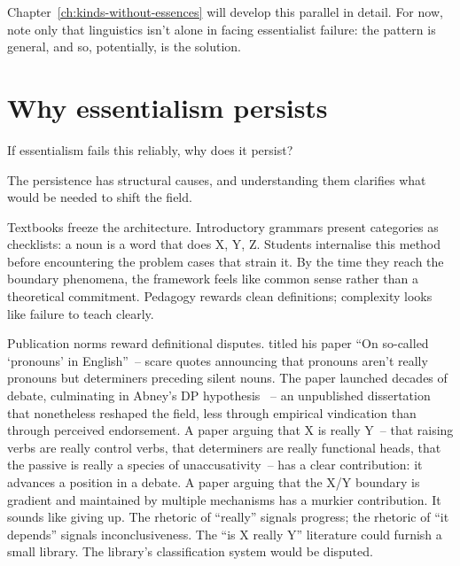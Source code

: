 Chapter~\ref{ch:kinds-without-essences} will develop this parallel in detail. For now, note only that linguistics isn't alone in facing essentialist failure: the pattern is general, and so, potentially, is the solution.

\section{Why essentialism persists}
\label{sec:2:why-essentialism-persists}

If essentialism fails this reliably, why does it persist?

The persistence has structural causes, and understanding them clarifies what would be needed to shift the field.

Textbooks freeze the architecture. Introductory grammars present categories as checklists: a noun is a word that does X, Y, Z. Students internalise this method before encountering the problem cases that strain it. By the time they reach the boundary phenomena, the framework feels like common sense rather than a theoretical commitment. Pedagogy rewards clean definitions; complexity looks like failure to teach clearly.

Publication norms reward definitional disputes. \textcite{postal1966} titled his paper \enquote{On so-called \enquote{pronouns} in English}~-- scare quotes announcing that pronouns aren't really pronouns but determiners preceding silent nouns. The paper launched decades of debate, culminating in Abney's DP hypothesis \autocite{abney1987}~-- an unpublished dissertation that nonetheless reshaped the field, less through empirical vindication than through perceived endorsement. A paper arguing that X is really Y~-- that raising verbs are really control verbs, that determiners are really functional heads, that the passive is really a species of unaccusativity~-- has a clear contribution: it advances a position in a debate. A paper arguing that the X/Y boundary is gradient and maintained by multiple mechanisms has a murkier contribution. It sounds like giving up. The rhetoric of \enquote{really} signals progress; the rhetoric of \enquote{it depends} signals inconclusiveness. The \enquote{is X really Y} literature could furnish a small library. The library's classification system would be disputed.

